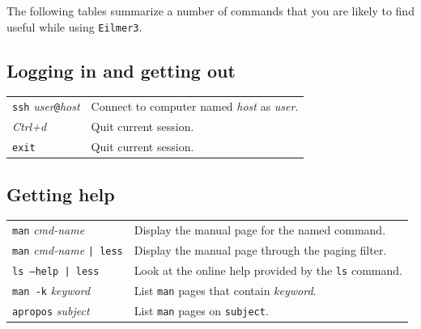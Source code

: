 \documentclass[12pt,a4paper,twoside]{article}
\begin{document}
The following tables summarize a number of commands that you are likely to find useful while
using \texttt{Eilmer3}.\\

\subsection*{Logging in and getting out}
\begin{tabular}{l|l}
 \texttt{ssh} \textit{user}\texttt{@}\textit{host} & Connect to computer named \textit{host} as \textit{user}. \\
 \textit{Ctrl+d} & Quit current session. \\
 \texttt{exit} & Quit current session. \\
\end{tabular}

\subsection*{Getting help}
\begin{tabular}{l|l}
 \texttt{man} \textit{cmd-name} & Display the manual page for the named command. \\
 \texttt{man} \textit{cmd-name} \texttt{| less} & Display the manual page through the paging filter. \\
 \texttt{ls --help | less} & Look at the online help provided by the \texttt{ls} command. \\
 \texttt{man -k} \textit{keyword} & List \texttt{man} pages that contain \textit{keyword}. \\
 \texttt{apropos} \textit{subject} & List \texttt{man} pages on \texttt{subject}. \\
\end{tabular}
 
\end{document}
